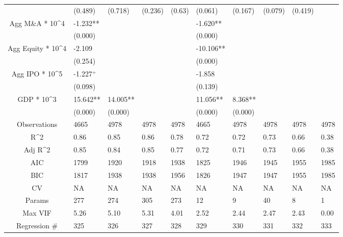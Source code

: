 \documentclass{article}
\begin{document}
\begin{table}[H]
\begin{tabular}{|clllllllll|}
   & (0.489) & (0.718) & (0.236) & (0.63) & (0.061) & (0.167) & (0.079) & (0.419) &  \\ 
  Agg M\&A * 10^4 & -1.232** &  &  &  & -1.620** &  &  &  &  \\ 
   & (0.000) &  &  &  & (0.000) &  &  &  &  \\ 
  Agg Equity * 10^4 & -2.109 &  &  &  & -10.106** &  &  &  &  \\ 
   & (0.254) &  &  &  & (0.000) &  &  &  &  \\ 
  Agg IPO * 10^5 & -1.227$^{+}$ &  &  &  & -1.858 &  &  &  &  \\ 
   & (0.098) &  &  &  & (0.139) &  &  &  &  \\ 
  GDP * 10^3 & 15.642** & 14.005** &  &  & 11.056** & 8.368** &  &  &  \\ 
   & (0.000) & (0.000) &  &  & (0.000) & (0.000) &  &  &  \\ 
  \hline 
 Observations & 4665 & 4978 & 4978 & 4978 & 4665 & 4978 & 4978 & 4978 & 4978 \\ 
  R^2 & 0.86 & 0.85 & 0.86 & 0.78 & 0.72 & 0.72 & 0.73 & 0.66 & 0.38 \\ 
  Adj R^2 & 0.85 & 0.84 & 0.85 & 0.77 & 0.72 & 0.71 & 0.73 & 0.66 & 0.38 \\ 
  AIC & 1799 & 1920 & 1918 & 1938 & 1825 & 1946 & 1945 & 1955 & 1985 \\ 
  BIC & 1817 & 1938 & 1938 & 1956 & 1826 & 1947 & 1947 & 1955 & 1985 \\ 
  CV & NA & NA & NA & NA & NA & NA & NA & NA & NA \\ 
  Params & 277 & 274 & 305 & 273 & 12 & 9 & 40 & 8 & 1 \\ 
  Max VIF & 5.26 & 5.10 & 5.31 & 4.01 & 2.52 & 2.44 & 2.47 & 2.43 & 0.00 \\ 
  Regression \# & 325 & 326 & 327 & 328 & 329 & 330 & 331 & 332 & 333 \\ 
   \hline
\end{tabular}
 
\end{table}
\end{document}
